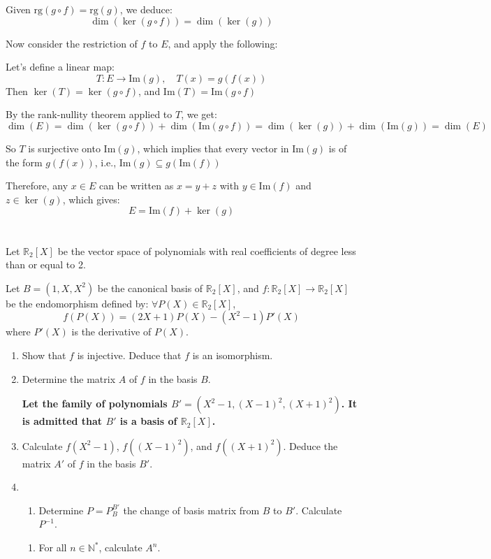 \documentclass[12pt]{article}
\begin{document}
\begin{answerbox}
\begin{enumerate}
Given $ \mathrm{rg}(g \circ f) = \mathrm{rg}(g) $, we deduce:
$$
\dim(\ker(g \circ f)) = \dim(\ker(g))
$$

Now consider the restriction of $ f $ to $ E $, and apply the following:

Let’s define a linear map:
$$
T : E \to \mathrm{Im}(g), \quad T(x) = g(f(x))
$$
Then $ \ker(T) = \ker(g \circ f) $, and $ \mathrm{Im}(T) = \mathrm{Im}(g \circ f) $

By the rank-nullity theorem applied to $ T $, we get:
$$
\dim(E) = \dim(\ker(g \circ f)) + \dim(\mathrm{Im}(g \circ f)) = \dim(\ker(g)) + \dim(\mathrm{Im}(g)) = \dim(E)
$$

So $ T $ is surjective onto $ \mathrm{Im}(g) $, which implies that every vector in $ \mathrm{Im}(g) $ is of the form $ g(f(x)) $, i.e., $ \mathrm{Im}(g) \subseteq g(\mathrm{Im}(f)) $

Therefore, any $ x \in E $ can be written as $ x = y + z $ with $ y \in \mathrm{Im}(f) $ and $ z \in \ker(g) $, which gives:
$$
E = \mathrm{Im}(f) + \ker(g)
$$

\end{enumerate}

\end{answerbox}

\newpage

\section{}
Let $\mathbb{R}_2[X]$ be the vector space of polynomials with real coefficients of degree less than or equal to 2.

Let $B = (1, X, X^2)$ be the canonical basis of $\mathbb{R}_2[X]$, and $f: \mathbb{R}_2[X] \to \mathbb{R}_2[X]$ be the endomorphism defined by:
$\forall P(X) \in \mathbb{R}_2[X]$,
\[f(P(X)) = (2X + 1)P(X) - (X^2 - 1)P'(X)\]
where $P'(X)$ is the derivative of $P(X)$.

\begin{enumerate}
    \item Show that $f$ is injective. Deduce that $f$ is an isomorphism.
    \item Determine the matrix $A$ of $f$ in the basis $B$.
    
    \textbf{Let the family of polynomials $B' = (X^2 - 1, (X - 1)^2, (X + 1)^2)$. It is admitted that $B'$ is a basis of $\mathbb{R}_2[X]$.}
    
    \item Calculate $f(X^2 - 1)$, $f((X - 1)^2)$, and $f((X + 1)^2)$. Deduce the matrix $A'$ of $f$ in the basis $B'$.
    \item 
    \begin{enumerate}
        \item Determine $P = P_{B}^{B'}$ the change of basis matrix from $B$ to $B'$. Calculate $P^{-1}$.
    \end{enumerate}
    \begin{enumerate}
        \item For all $n \in \mathbb{N}^*$, calculate $A^n$.
    \end{enumerate}
\end{enumerate}
\end{document}
